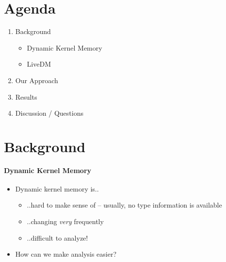 \documentclass{i20lecture}
\subtitle{LiveDM - Proof of Concept}
\begin{document}
\frame{\titlepage}

\section{Agenda}
\begin{frame}{\insertsection}
  \begin{enumerate}
   \item Background
    \begin{itemize}
        \item Dynamic Kernel Memory
        \item LiveDM
    \end{itemize}
    \item Our Approach
    \item Results
    \item Discussion / Questions
  \end{enumerate}
\end{frame}

\section{Background}
\begin{frame}{\insertsection}
  \framesubtitle{Dynamic Kernel Memory}
  
  \begin{itemize}
    \item Dynamic kernel memory is..
    \begin{itemize}
\pause
    \item ..hard to make sense of -- usually, no type information is available
\pause
    \item ..changing \textit{very} frequently
\pause
    \item ..difficult to analyze!
    \end{itemize}
\pause
    \item How can we make analysis easier?
  \end{itemize}
\end{frame}
\end{document}
